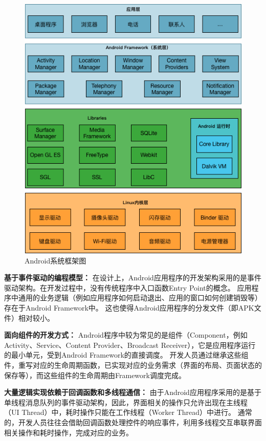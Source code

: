 \begin{figure}[!h]
	\centering
	\includegraphics[width=\textwidth]{./Figures/Android-Framework.png}
	\caption{Android系统框架图}
	\label{fig:Android-Framework}
\end{figure}


\textbf{基于事件驱动的编程模型：}
在设计上，Android应用程序的开发架构采用的是事件驱动架构。在开发过程中，没有传统程序中入口函数Entry Point的概念。
应用程序中通用的业务逻辑（例如应用程序如何启动退出、应用的窗口如何创建销毁等）存在于Android Framework中。
这也使得Android应用程序的分发文件（即APK文件）相对较小。

\textbf{面向组件的开发方式：}
Android程序中较为常见的是组件（Component，例如Activity、Service、Content Provider、Broadcast Receiver），它是应用程序运行的最小单元，受到Android Framework的直接调度。
开发人员通过继承这些组件，重写对应的生命周期函数，已实现对应的业务需求（界面的布局、页面状态的保存等），而这些组件的生命周期由Framework调度完成。

\textbf{大量逻辑实现依赖于回调函数和多线程通信：}
由于Android应用程序采用的是基于单线程消息队列的事件驱动架构，因此，界面相关的操作只允许出现在主线程（UI Thread）中，耗时操作只能在工作线程（Worker Thread）中进行。
通常的，开发人员往往会借助回调函数处理控件的响应事件，利用多线程交互串联界面相关操作和耗时操作，完成对应的业务。


